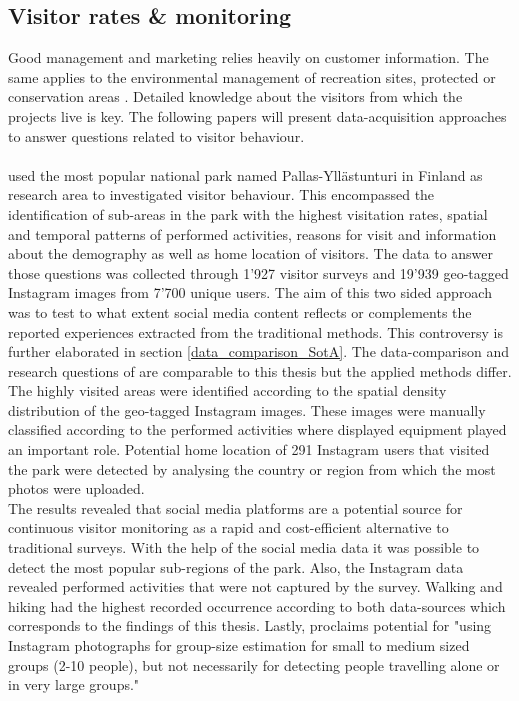 \subsection{Visitor rates \& monitoring}
Good management and marketing relies heavily on customer information. The same applies to the environmental management of recreation sites, protected or conservation areas \parencite{Ralf1991}. Detailed knowledge about the visitors from which the projects live is key. The following papers will present data-acquisition approaches to answer questions related to visitor behaviour.  

\paragraph*{\textcite{Heikinheimo2017}} used the most popular national park named Pallas-Yll\"astunturi in Finland as research area to investigated visitor behaviour. This encompassed the identification of sub-areas in the park with the highest visitation rates, spatial and temporal patterns of performed activities, reasons for visit and information about the demography as well as home location of visitors. The data to answer those questions was collected through 1'927 visitor surveys and 19'939 geo-tagged Instagram images from 7'700 unique users. The aim of this two sided approach was to test to what extent social media content reflects or complements the reported experiences extracted from the traditional methods. This controversy is further elaborated in section \ref{data_comparison_SotA}. The data-comparison and research questions of \textcite{Heikinheimo2017} are comparable to this thesis but the applied methods differ.
The highly visited areas were identified according to the spatial density distribution of the geo-tagged Instagram images. These images were manually classified according to the performed activities where displayed equipment played an important role. Potential home location of 291 Instagram users that visited the park were detected by analysing the country or region from which the most photos were uploaded. \\
The results revealed that social media platforms are a potential source for continuous visitor monitoring as a rapid and cost-efficient alternative to traditional surveys. With the help of the social media data it was possible to detect the most popular sub-regions of the park. Also, the Instagram data revealed performed activities that were not captured by the survey. Walking and hiking had the highest recorded occurrence according to both data-sources which corresponds to the findings of this thesis. Lastly, \textcite[p.10]{Heikinheimo2017} proclaims potential for "using Instagram photographs for group-size estimation for small to medium sized groups (2-10 people), but not necessarily for detecting people travelling alone or in very large groups." 

